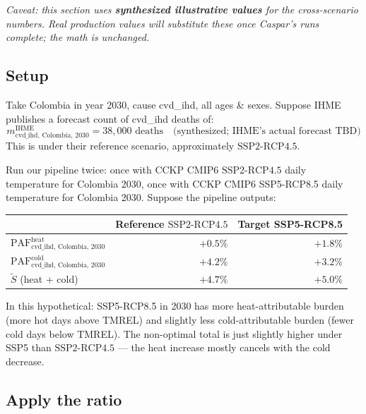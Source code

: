 \documentclass[11pt]{article}
\newcommand{\PAF}{\text{PAF}}
\newcommand{\SSPtwo}{\text{SSP2{-}RCP4.5}}
\newcommand{\mIHME}{m^{\text{IHME}}}
\begin{document}
\textit{Caveat: this section uses \textbf{synthesized illustrative
values} for the cross-scenario numbers. Real production values will
substitute these once Caspar's runs complete; the math is unchanged.}

\subsection{Setup}

Take Colombia in year 2030, cause cvd\_ihd, all ages \& sexes. Suppose
IHME publishes a forecast count of cvd\_ihd deaths of:
\[
\mIHME_{\text{cvd\_ihd, Colombia, 2030}} = 38{,}000 \text{ deaths}
\quad \text{(synthesized; IHME's actual forecast TBD)}
\]
This is under their reference scenario, approximately $\SSPtwo$.

Run our pipeline twice: once with CCKP CMIP6 $\SSPtwo$ daily temperature
for Colombia 2030, once with CCKP CMIP6 SSP5-RCP8.5 daily temperature for
Colombia 2030. Suppose the pipeline outputs:

\begin{center}
\renewcommand{\arraystretch}{1.1}
\begin{tabular}{l r r}
\toprule
& Reference $\SSPtwo$ & Target SSP5-RCP8.5 \\
\midrule
$\PAF^{\text{heat}}_{\text{cvd\_ihd, Colombia, 2030}}$ & $+0.5\%$ & $+1.8\%$ \\
$\PAF^{\text{cold}}_{\text{cvd\_ihd, Colombia, 2030}}$ & $+4.2\%$ & $+3.2\%$ \\
$\tilde S$ (heat + cold)                           & $+4.7\%$ & $+5.0\%$ \\
\bottomrule
\end{tabular}
\end{center}

In this hypothetical: SSP5-RCP8.5 in 2030 has more heat-attributable
burden (more hot days above TMREL) and slightly less cold-attributable
burden (fewer cold days below TMREL). The non-optimal total is just
slightly higher under SSP5 than $\SSPtwo$ --- the heat increase mostly
cancels with the cold decrease.

\subsection{Apply the ratio}
\end{document}
